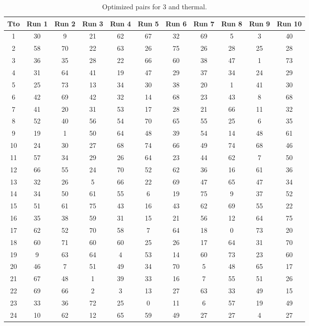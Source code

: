 \begin{table}
  \centering
  \scriptsize
  \caption{Optimized pairs for 3 and thermal.}
  \label{tab_pairs}
\begin{tabular}{c c c c c c c c c c c }
\hline
Tto & Run 1 & Run 2 & Run 3 & Run 4 & Run 5 & Run 6 & Run 7 & Run 8 & Run 9 & Run 10 \\
\hline
1 & 30 & 9 & 21 & 62 & 67 & 32 & 69 & 5 & 3 & 40 \\
2 & 58 & 70 & 22 & 63 & 26 & 75 & 26 & 28 & 25 & 28 \\
3 & 36 & 35 & 28 & 22 & 66 & 60 & 38 & 47 & 1 & 73 \\
4 & 31 & 64 & 41 & 19 & 47 & 29 & 37 & 34 & 24 & 29 \\
5 & 25 & 73 & 13 & 34 & 30 & 38 & 20 & 1 & 41 & 30 \\
6 & 42 & 69 & 42 & 32 & 14 & 68 & 23 & 43 & 8 & 68 \\
7 & 41 & 20 & 31 & 53 & 17 & 28 & 21 & 66 & 11 & 32 \\
8 & 52 & 40 & 56 & 54 & 70 & 65 & 55 & 25 & 6 & 35 \\
9 & 19 & 1 & 50 & 64 & 48 & 39 & 54 & 14 & 48 & 61 \\
10 & 24 & 30 & 27 & 68 & 74 & 66 & 49 & 74 & 68 & 46 \\
11 & 57 & 34 & 29 & 26 & 64 & 23 & 44 & 62 & 7 & 50 \\
12 & 66 & 55 & 24 & 70 & 52 & 62 & 36 & 16 & 61 & 36 \\
13 & 32 & 26 & 5 & 66 & 22 & 69 & 47 & 65 & 47 & 34 \\
14 & 34 & 50 & 61 & 55 & 6 & 19 & 75 & 9 & 37 & 52 \\
15 & 51 & 61 & 75 & 43 & 16 & 43 & 62 & 69 & 55 & 22 \\
16 & 35 & 38 & 59 & 31 & 15 & 21 & 56 & 12 & 64 & 75 \\
17 & 62 & 52 & 70 & 58 & 7 & 64 & 18 & 0 & 73 & 20 \\
18 & 60 & 71 & 60 & 60 & 25 & 26 & 17 & 64 & 31 & 70 \\
19 & 9 & 63 & 64 & 4 & 53 & 14 & 60 & 73 & 23 & 60 \\
20 & 46 & 7 & 51 & 49 & 34 & 70 & 5 & 48 & 65 & 17 \\
21 & 67 & 48 & 1 & 39 & 33 & 16 & 7 & 55 & 51 & 26 \\
22 & 69 & 66 & 2 & 3 & 13 & 27 & 63 & 33 & 49 & 15 \\
23 & 33 & 36 & 72 & 25 & 0 & 11 & 6 & 57 & 19 & 49 \\
24 & 10 & 62 & 12 & 65 & 59 & 49 & 27 & 27 & 4 & 27 \\

\end{tabular}
\end{table}
